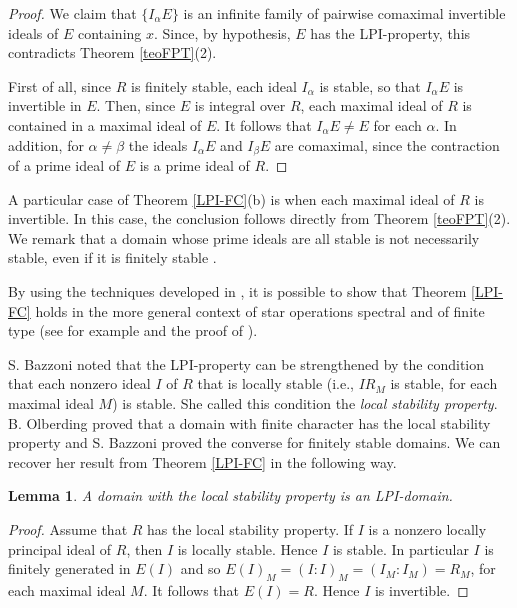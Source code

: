 \documentclass[12pt]{amsart}
\newtheorem{lemma}[theorem]{Lemma}
\theoremstyle{definition}
\begin{document}
\begin{proof}
We claim that $\{I_{\alpha} E\}$ is an infinite  family of pairwise comaximal  invertible  ideals of $E$ containing $x$. Since, by hypothesis,  $E$ has the LPI-property, this contradicts  Theorem \ref{teoFPT}(2).

First of all, since $R$ is finitely stable, each ideal $I_{\alpha}$ is  stable, so that $I_{\alpha} E$ is  invertible in $E$.
Then, since  $E$ is integral over $R$, 
each maximal ideal of $R$ is contained in a maximal ideal of $E$. It follows that $I_{\alpha} E\neq E$ for each ${\alpha}$.  In addition, for ${\alpha}\neq {\beta}$ the ideals $I_{\alpha} E$ and $I_{\beta} E$ are comaximal, since the contraction of a prime ideal of $E$ is a prime ideal of $R$.
\end{proof}

A particular case of Theorem \ref{LPI-FC}(b) is when each maximal ideal of $R$ is invertible. In this case, the conclusion follows directly from Theorem \ref{teoFPT}(2). 
We remark that a domain whose prime ideals are all stable is not necessarily stable, even if it is finitely stable \cite[Section 3]{O1}.

By using the techniques developed in \cite{GP1}, it is possible to show that Theorem \ref{LPI-FC} holds in the more general context of star operations spectral and of finite type (see for example \cite[Proposition 5.5]{GP1} and the proof of \cite[Theorem 5.2]{GP1}).

S. Bazzoni noted  that the LPI-property  can be strengthened by the condition that each nonzero ideal $I$ of $R$ that is locally stable (i.e.,  $IR_M$ is stable, for each maximal ideal $M$) is stable. She called this condition the \emph{local stability property}. B. Olberding proved that a domain with finite character has the local stability property \cite[Lemma 4.3]{O3} and S. Bazzoni proved the converse \cite[Theorem 4.5]{B4} for finitely stable domains. We can recover her result from Theorem \ref{LPI-FC} in the following way.

\begin{lemma} \cite[Lemma 3.2]{B4} \label{LSP} A domain with the local stability property is an LPI-domain.
\end{lemma}
\begin{proof} Assume that $R$ has the local stability property. If $I$ is a nonzero locally principal ideal of $R$, then $I$ is locally stable. Hence $I$ is stable. In particular $I$ is finitely generated in $E(I)$ and so $E(I)_M=(I:I)_M=(I_M:I_M)=R_M$, for each maximal ideal $M$. It follows that $E(I)=R$. Hence $I$ is invertible.
\end{proof}
\end{document}
